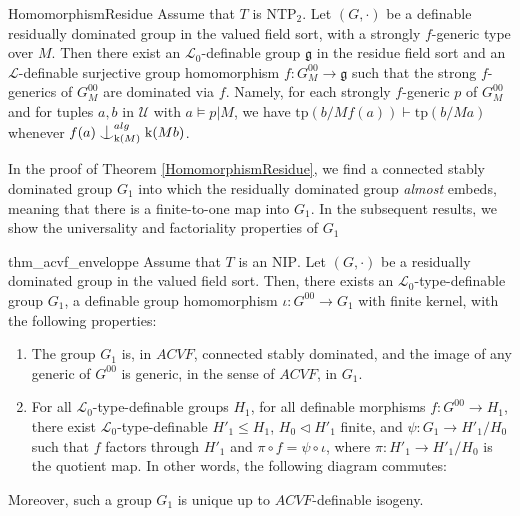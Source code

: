 \documentclass[12pt]{article}
\newcommand{\tpp}{\mathrm{tp}}
\newcommand{\NIP}{\mathrm{NIP}}
\newcommand{\NTP}{\mathrm{NTP_2}}
\newcommand{\0}{\emptyset}
\newcommand{\rf}{\mathrm{k}}
\newcommand{\U}{\mathcal{U}}
\def\forkindep{\mathrel{\raise0.2ex\hbox{\ooalign{\hidewidth$\vert$\hidewidth\cr\raise-0.9ex\hbox{$\smile$}}}}}
\theoremstyle{plain}%
\theoremstyle{definition}
\theoremstyle{remark}
\begin{document}
\begin{repthm}{HomomorphismResidue} Assume that $T$ is $\NTP$. Let $(G,\cdot)$ be a definable residually dominated group in the valued field sort, with a strongly $f$-generic type over $M$. Then there exist an $\mathcal{L}_0$-definable group $\mathfrak{g}$ in the residue field sort and an $\mathcal{L}$-definable surjective group homomorphism $f: G_M^{00}\to \mathfrak{g}$ such that the strong $f$-generics of $G_M^{00}$ are dominated via $f$. Namely, for each strongly $f$-generic $p$ of $G_M^{00}$ and for tuples $a, b$ in $\U$ with $a \models p|M$, we have $\tpp(b/M f(a))\vdash \tpp(b/Ma)$ whenever $f(a)\forkindep_{\rf(M)}^{alg}\rf(Mb)$.

\end{repthm}
In the proof of Theorem \ref{HomomorphismResidue}, we find a connected stably dominated group $G_1$ into which the residually dominated group \emph{almost} embeds, meaning that there is a finite-to-one map into $G_1$. In the subsequent results, we show the universality and factoriality properties of $G_1$
\begin{repthm}{thm_acvf_enveloppe} Assume that $T$ is an $\NIP$. Let $(G,\cdot)$ be a residually dominated group in the valued field sort. Then, there exists an $\mathcal{L}_0$-type-definable group $G_1$, a definable group homomorphism $\iota: G^{00} \rightarrow G_1$ with finite kernel, with the following properties:
 \begin{enumerate}
        \item The group $G_1$ is, in $ACVF$, connected stably dominated, and the image of any generic of $G^{00}$ is generic, in the sense of $ACVF$, in $G_1$.
        \item For all $\mathcal{L}_0$-type-definable groups $H_1$, for all definable morphisms $f: G^{00} \rightarrow H_1$, there exist $\mathcal{L}_0$-type-definable $H'_1 \leq H_1$, $H_0 \lhd H'_1$ finite, and $\psi: G_1 \rightarrow H'_1/H_0$ such that $f$ factors through $H'_1$ and $\pi \circ f = \psi \circ \iota$, where $\pi : H'_1 \rightarrow H'_1 / H_0$ is the quotient map. In other words, the following diagram commutes:
    \end{enumerate}
\begin{center}
\end{center}
Moreover, such a group $G_1$ is unique up to $ACVF$-definable isogeny.
\end{repthm}
\end{document}
